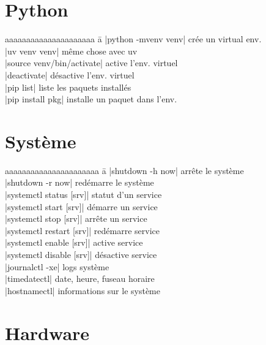 \documentclass[9pt]{extarticle}
\begin{document}
\begin{multicols}{4}
    \section*{Python}
    \begin{tabbing}
        aaaaaaaaaaaaaaaaaaaaa \= a \kill
        \code|python -mvenv venv| \> crée un virtual env. \\
        \code|uv venv venv| \> même chose avec uv \\
        \code|source venv/bin/activate| \> active l'env. virtuel \\
        \code|deactivate| \> désactive l'env. virtuel \\
        \code|pip list| \> liste les paquets installés \\
        \code|pip install pkg| installe un paquet dans l'env. \\
    \end{tabbing}

    \section*{Système}

    \begin{tabbing}
        aaaaaaaaaaaaaaaaaaaaaa \= a \kill
        \code|shutdown -h now| \> arrête le système \\
        \code|shutdown -r now| \> redémarre le système \\
        \code|systemctl status [srv]| \> statut d'un service \\
        \code|systemctl start [srv]| \> démarre un service \\
        \code|systemctl stop [srv]| \> arrête un service \\
        \code|systemctl restart [srv]| \> redémarre service \\
        \code|systemctl enable [srv]| \> active service \\
        \code|systemctl disable [srv]| \> désactive service \\
        \code|journalctl -xe| \> logs système \\
        \code|timedatectl| \quad date, heure, fuseau horaire \\
        \code|hostnamectl| \quad informations sur le système \\
    \end{tabbing}

    \section*{Hardware}


\end{multicols}
\end{document}
